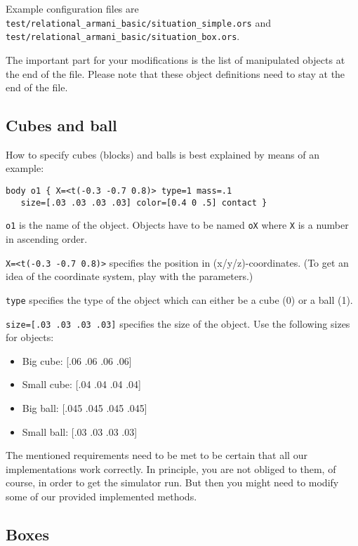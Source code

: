 \documentclass[10pt,twoside,twocolumn,fleqn]{article}
\begin{document}
Example configuration files are
\texttt{test/relational\_armani\_basic/situation\_simple.ors} and
\texttt{test/relational\_armani\_basic/situation\_box.ors}.

The important part for your modifications is the list of manipulated
objects at the end of the file. Please note that these object
definitions need to stay at the end of the file.

\subsection{Cubes and ball}

How to specify cubes (blocks) and balls is best explained by means of an
example:

\begin{lstlisting}
body o1 { X=<t(-0.3 -0.7 0.8)> type=1 mass=.1
   size=[.03 .03 .03 .03] color=[0.4 0 .5] contact }
\end{lstlisting}

\texttt{o1} is the name of the object. Objects have to be named \texttt{oX}
where \texttt{X} is a number in ascending order.

\texttt{X=<t(-0.3 -0.7 0.8)>} specifies the position in (x/y/z)-coordinates.
(To get an idea of the coordinate system, play with the parameters.)

\texttt{type} specifies the type of the object which can either be a cube (0) or
a ball (1).

\texttt{size=[.03 .03 .03 .03]} specifies the size of the object. Use the
following sizes for objects:
\begin{itemize}
  \item Big cube: [.06 .06 .06 .06]
  \item Small cube: [.04 .04 .04 .04]
  \item Big ball: [.045 .045 .045 .045]
  \item Small ball: [.03 .03 .03 .03]
\end{itemize}

The mentioned requirements need to be met to be certain that all our
implementations work correctly. In principle, you are not obliged to
them, of course, in order to get the simulator run. But then you might
need to modify some of our provided implemented methods.


\subsection{Boxes}
\end{document}
